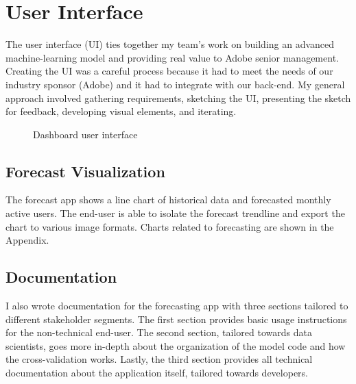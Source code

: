 \documentclass[11pt, oneside, authoryear]{report}
\begin{document}
\section{User Interface}
\label{user_interface}
The user interface (UI) ties together my team's work on building an advanced machine-learning model and providing real value to Adobe senior management. Creating the UI was a careful process because it had to meet the needs of our industry sponsor (Adobe) and it had to integrate with our back-end. My general approach involved gathering requirements, sketching the UI, presenting the sketch for feedback, developing visual elements, and iterating.

\begin{figure}[h]
  \caption{Dashboard user interface}
  \centering
  \label{fig:Dashboard}
\end{figure}

\subsection{Forecast Visualization}
The forecast app shows a line chart of historical data and forecasted monthly active users. The end-user is able to isolate the forecast trendline and export the chart to various image formats. Charts related to forecasting are shown in the Appendix.

\subsection{Documentation}
I also wrote documentation for the forecasting app with three sections tailored to different stakeholder segments. The first section provides basic usage instructions for the non-technical end-user. The second section, tailored towards data scientists, goes more in-depth about the organization of the model code and how the cross-validation works. Lastly, the third section provides all technical documentation about the application itself, tailored towards developers.
\end{document}
